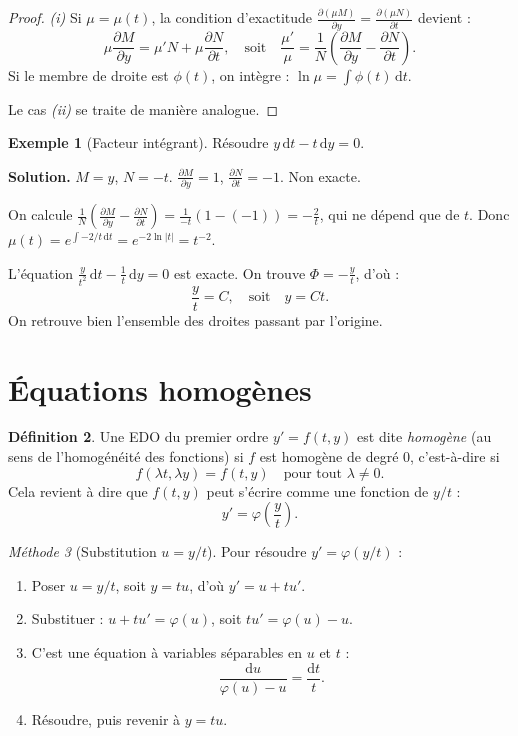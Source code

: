 \documentclass[12pt,a4paper,openany]{book}
\theoremstyle{definition}
\newtheorem{definition}{Définition}[chapter]
\newtheorem{exemple}[definition]{Exemple}
\theoremstyle{plain}
\theoremstyle{remark}
\newtheorem{methode}[definition]{Méthode}
\newcommand{\dd}{\mathrm{d}}
\begin{document}
\begin{proof}
\textit{(i)} Si $\mu = \mu(t)$, la condition d'exactitude $\frac{\partial(\mu M)}{\partial y} = \frac{\partial(\mu N)}{\partial t}$ devient :
\[
\mu \frac{\partial M}{\partial y} = \mu' N + \mu \frac{\partial N}{\partial t}, \quad \text{soit} \quad \frac{\mu'}{\mu} = \frac{1}{N}\!\left(\frac{\partial M}{\partial y} - \frac{\partial N}{\partial t}\right).
\]
Si le membre de droite est $\phi(t)$, on intègre : $\ln\mu = \int \phi(t)\,\dd t$.

Le cas \textit{(ii)} se traite de manière analogue.
\end{proof}

\begin{exemple}[Facteur intégrant]
\label{ex:facteur-integrant}
Résoudre $y\,\dd t - t\,\dd y = 0$.

\textbf{Solution.} $M = y$, $N = -t$. $\frac{\partial M}{\partial y} = 1$, $\frac{\partial N}{\partial t} = -1$. Non exacte.

On calcule $\frac{1}{N}\!\left(\frac{\partial M}{\partial y} - \frac{\partial N}{\partial t}\right) = \frac{1}{-t}(1 - (-1)) = -\frac{2}{t}$, qui ne dépend que de $t$. Donc $\mu(t) = e^{\int -2/t\,\dd t} = e^{-2\ln|t|} = t^{-2}$.

L'équation $\frac{y}{t^2}\,\dd t - \frac{1}{t}\,\dd y = 0$ est exacte. On trouve $\Phi = -\frac{y}{t}$, d'où :
\[
\boxed{\frac{y}{t} = C, \quad \text{soit} \quad y = Ct.}
\]
On retrouve bien l'ensemble des droites passant par l'origine.
\end{exemple}

\section{Équations homogènes}
\label{sec:homogenes}

\begin{definition}
\label{def:homogene}
Une EDO du premier ordre $y' = f(t,y)$ est dite \emph{homogène} (au sens de l'homogénéité des fonctions) si $f$ est homogène de degré $0$, c'est-à-dire si
\[
f(\lambda t, \lambda y) = f(t, y) \quad \text{pour tout } \lambda \neq 0.
\]
Cela revient à dire que $f(t,y)$ peut s'écrire comme une fonction de $y/t$ :
\[
y' = \varphi\!\left(\frac{y}{t}\right).
\]
\end{definition}

\begin{methode}[Substitution $u = y/t$]
\label{meth:homogene}
Pour résoudre $y' = \varphi(y/t)$ :
\begin{enumerate}
\item Poser $u = y/t$, soit $y = tu$, d'où $y' = u + tu'$.
\item Substituer : $u + tu' = \varphi(u)$, soit $tu' = \varphi(u) - u$.
\item C'est une équation à variables séparables en $u$ et $t$ :
\[
\frac{\dd u}{\varphi(u) - u} = \frac{\dd t}{t}.
\]
\item Résoudre, puis revenir à $y = tu$.
\end{enumerate}
\end{methode}
\end{document}
